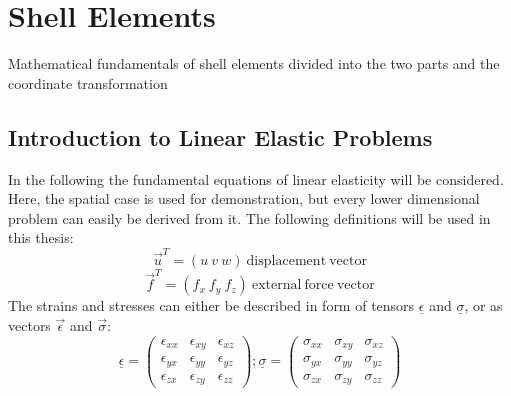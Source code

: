 \section{Shell Elements}
Mathematical fundamentals of shell elements divided into the two parts and the coordinate transformation
 
 
 
 
 
 \subsection{Introduction to Linear Elastic Problems}
 In the following the fundamental equations of linear elasticity will be considered. Here, the spatial case is used for demonstration, but every lower dimensional problem can easily be derived from it.
 The following definitions will be used in this thesis:
 \begin{equation}
 \vec{u}^T = \left(u\ v\ w\right)\ \mathrm{displacement\ vector}
 \end{equation}
 \begin{equation}
 \vec{f}^T = \left(f_x\ f_y\ f_z\right)\ \mathrm{external\ force\ vector}
 \end{equation}
 The strains and stresses can either be described in form of tensors $\underline{\epsilon}$ and $\underline{\sigma}$, or as vectors $\vec{\epsilon}$ and $\vec{\sigma}$:
 \begin{equation}
 \underline{\epsilon} = \begin{pmatrix}
 \epsilon_{xx} & \epsilon_{xy} & \epsilon_{xz} \\
 \epsilon_{yx} & \epsilon_{yy} & \epsilon_{yz} \\
 \epsilon_{zx} & \epsilon_{zy} & \epsilon_{zz} \end{pmatrix};
 \underline{\sigma} = \begin{pmatrix}
 \sigma_{xx} & \sigma_{xy} & \sigma_{xz} \\
 \sigma_{yx} & \sigma_{yy} & \sigma_{yz} \\
 \sigma_{zx} & \sigma_{zy} & \sigma_{zz} \end{pmatrix}
 \end{equation}
